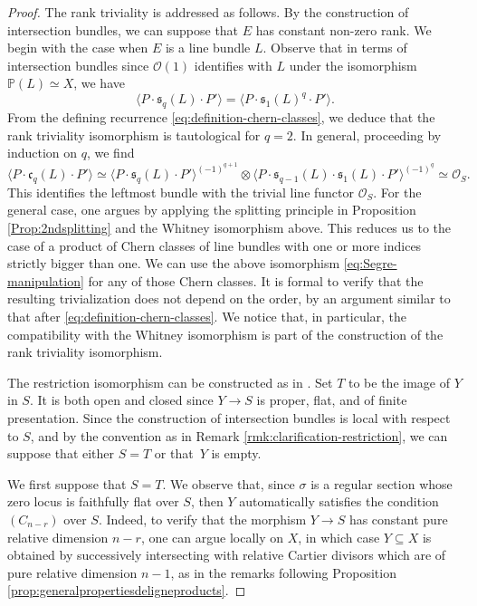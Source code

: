 \documentclass[11pt]{article}
\theoremstyle{plain}
\theoremstyle{definition}
\newcommand{\PBbb}{\mathbb P}
\newcommand{\Ocal}{\mathcal O}
\newcommand{\cfrak}{\mathfrak c}
\newcommand{\sfrak}{\mathfrak s}
\begin{document}
\begin{proof}
The rank triviality is addressed as follows. By the construction of intersection bundles, we can suppose that $E$ has constant non-zero rank. We begin with the case when $E$ is a line bundle $L$. Observe that in terms of intersection bundles since $\Ocal(1)$ identifies with $L$ under the isomorphism $\PBbb(L)\simeq X$, we have
\begin{displaymath}
\langle P \cdot \sfrak_q(L) \cdot P' \rangle = \langle P \cdot \sfrak_1(L)^q \cdot P' \rangle.
\end{displaymath}
From the defining recurrence \eqref{eq:definition-chern-classes}, we deduce that the rank triviality isomorphism is tautological for $q=2$. In general, proceeding by induction on $q$, we find
\begin{equation}\label{eq:Segre-manipulation}
\langle P \cdot \cfrak_{q}(L) \cdot P' \rangle \simeq \langle P \cdot \sfrak_{q}(L) \cdot P' \rangle^{(-1)^{q+1}} \otimes \langle P \cdot \sfrak_{q-1}(L) \cdot \sfrak_1(L) \cdot P' \rangle^{(-1)^{q}} \simeq \Ocal_S.
\end{equation}
This identifies the leftmost bundle with the trivial line functor $\Ocal_S$. For the general case, one argues by applying the splitting principle in Proposition \ref{Prop:2ndsplitting} and the Whitney isomorphism above. This reduces us to the case of a product of Chern classes of line bundles with one or more indices strictly bigger than one. We can use the above isomorphism \eqref{eq:Segre-manipulation} for any of those Chern classes. It is formal to verify that the resulting trivialization does not depend on the order, by an argument similar to that after \eqref{eq:definition-chern-classes}. We notice that, in particular, the compatibility with the Whitney isomorphism is part of the construction of the rank triviality isomorphism.

The restriction isomorphism can be constructed as in \cite[\textsection V.4.9]{Elkikfib}. Set $T$ to be the image of $Y$ in $S$. It is both open and closed since $Y\to S$ is proper, flat, and of finite presentation. Since the construction of intersection bundles is local with respect to $S$, and by the convention as in Remark \ref{rmk:clarification-restriction}, we can suppose that either $S = T$ or that~$Y$ is empty.

We first suppose that $S=T$. We observe that, since $\sigma$ is a regular section whose zero locus is faithfully flat over $S$, then $Y$ automatically satisfies the condition $(C_{n-r})$ over $S$. Indeed, to verify that the morphism $Y \to S$ has constant pure relative dimension $n-r$, one can argue locally on $X$, in which case $Y \subseteq X$ is obtained by successively intersecting with relative Cartier divisors which are of pure relative dimension $n-1$, as in the remarks following Proposition \ref{prop:generalpropertiesdeligneproducts}.


\end{proof}
\end{document}
